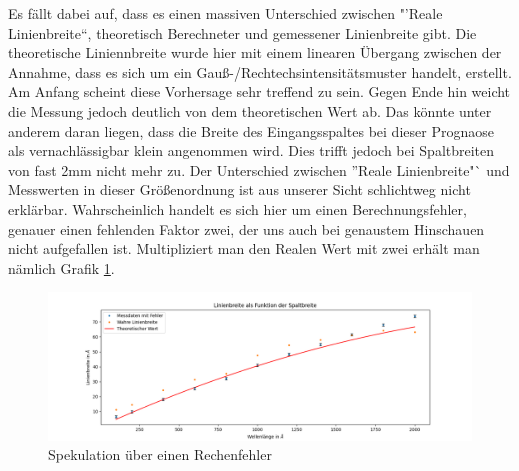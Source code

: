 Es fällt dabei auf, dass es einen massiven Unterschied zwischen "'Reale Linienbreite"`, theoretisch Berechneter und gemessener Linienbreite gibt. Die theoretische Liniennbreite wurde hier mit einem linearen 
Übergang zwischen der Annahme, dass es sich um ein Gauß-/Rechtechsintensitätsmuster handelt, erstellt. Am Anfang scheint diese Vorhersage sehr treffend zu sein. Gegen Ende hin weicht die Messung 
jedoch deutlich von dem theoretischen Wert ab. Das könnte unter anderem daran liegen, dass die Breite des Eingangsspaltes bei dieser Prognaose als vernachlässigbar klein angenommen wird. 
Dies trifft jedoch bei Spaltbreiten von fast 2mm nicht mehr zu. Der Unterschied zwischen "'Reale Linienbreite"` und Messwerten in dieser Größenordnung ist aus unserer Sicht schlichtweg nicht erklärbar.
Wahrscheinlich handelt es sich hier um einen Berechnungsfehler, genauer einen fehlenden Faktor zwei, der uns auch bei genaustem Hinschauen nicht aufgefallen ist. Multipliziert man den Realen Wert mit zwei 
erhält man nämlich Grafik \ref{Vergleich}.
\begin{figure}[h]
    \centering
    \includegraphics[width = \linewidth]{Bilder/Spaltbreite_Linie_vgl.png}
    \caption{Spekulation über einen Rechenfehler}
    \label{Vergleich}
\end{figure}

